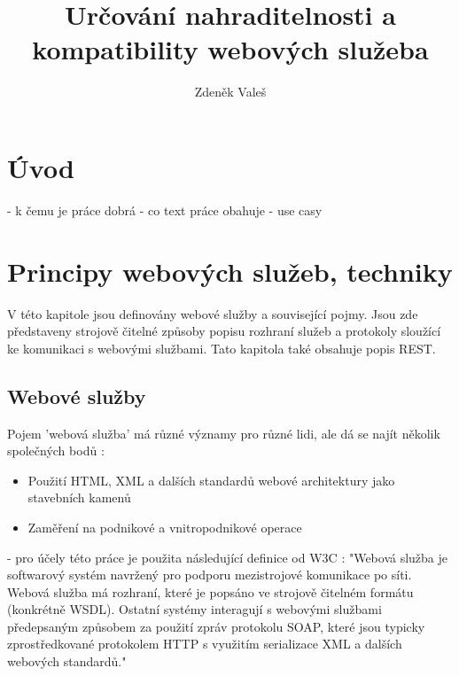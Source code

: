 \documentclass[czech,DP]{thesiskiv}
\author{Zdeněk Valeš}
\title{Určování nahraditelnosti a\\kompatibility webových služeba}
\begin{document}
%
\maketitle
\tableofcontents

\chapter{Úvod}

- k čemu je práce dobrá
- co text práce obahuje
- use casy

\chapter{Principy webových služeb, techniky}


V této kapitole jsou definovány webové služby a související pojmy. Jsou zde představeny strojově čitelné způsoby popisu rozhraní služeb a protokoly sloužící ke komunikaci s webovými službami. Tato kapitola také obsahuje popis REST. 

%

\section{Webové služby}

Pojem 'webová služba' má různé významy pro různé lidi, ale dá se najít několik společných bodů \cite{w3cWsDesignIssues}:
\begin{itemize}
	\item Použití HTML, XML a dalších standardů webové architektury jako stavebních kamenů
	\item Zaměření na podnikové a vnitropodnikové operace
\end{itemize}

 - pro účely této práce je použita následující definice od W3C \cite{w3cWsArch}:
 "Webová služba je softwarový systém navržený pro podporu mezistrojové komunikace po síti. Webová služba má rozhraní, které je popsáno ve strojově čitelném formátu (konkrétně WSDL). Ostatní systémy interagují s webovými službami předepsaným způsobem za použití zpráv protokolu SOAP, které jsou typicky zprostředkované protokolem HTTP s využitím serializace XML a dalších webových standardů."
 
\end{document}

